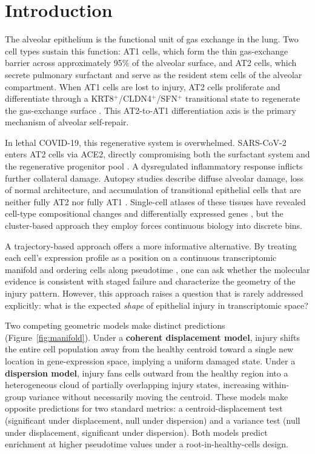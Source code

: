 \documentclass[11pt,a4paper]{article}
\begin{document}
\section{Introduction}

The alveolar epithelium is the functional unit of gas exchange in the lung. Two
cell types sustain this function: AT1 cells, which form the thin gas-exchange
barrier across approximately 95\% of the alveolar surface, and AT2 cells, which
secrete pulmonary surfactant and serve as the resident stem cells of the alveolar
compartment. When AT1 cells are lost to injury, AT2 cells proliferate and
differentiate through a KRT8$^+$/CLDN4$^+$/SFN$^+$ transitional state to
regenerate the gas-exchange surface \citep{Barkauskas2013, Kobayashi2020, Strunz2020}.
This AT2-to-AT1 differentiation axis is the primary mechanism of alveolar
self-repair.

In lethal COVID-19, this regenerative system is overwhelmed. SARS-CoV-2 enters
AT2 cells via ACE2, directly compromising both the surfactant system and the
regenerative progenitor pool \citep{Ziegler2020, Hou2020}. A dysregulated
inflammatory response inflicts further collateral damage. Autopsy studies describe
diffuse alveolar damage, loss of normal architecture, and accumulation of
transitional epithelial cells that are neither fully AT2 nor fully AT1 \citep{Borczuk2020, Melms2021}. Single-cell atlases of these tissues have revealed cell-type
compositional changes and differentially expressed genes \citep{Melms2021, Delorey2021}, but the cluster-based approach they employ forces continuous biology into
discrete bins.

A trajectory-based approach offers a more informative alternative. By treating
each cell's expression profile as a position on a continuous transcriptomic
manifold and ordering cells along pseudotime \citep{Haghverdi2016, Setty2019}, one
can ask whether the molecular evidence is consistent with staged failure and
characterize the geometry of the injury pattern. However, this approach raises a
question that is rarely addressed explicitly: what is the expected \textit{shape} of
epithelial injury in transcriptomic space?

Two competing geometric models make distinct predictions (Figure~\ref{fig:manifold}). Under a
\textbf{coherent displacement model}, injury shifts the entire cell population away from
the healthy centroid toward a single new location in gene-expression space,
implying a uniform damaged state. Under a \textbf{dispersion model}, injury fans cells
outward from the healthy region into a heterogeneous cloud of partially
overlapping injury states, increasing within-group variance without necessarily
moving the centroid. These models make opposite predictions for two standard
metrics: a centroid-displacement test (significant under displacement, null under
dispersion) and a variance test (null under displacement, significant under
dispersion). Both models predict enrichment at higher pseudotime values under a
root-in-healthy-cells design.
\end{document}
